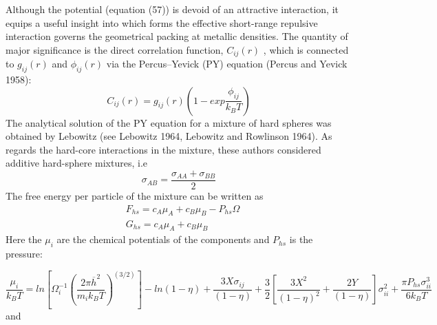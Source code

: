 \documentclass[12pt]{article}
\newcommand*{\1}{\hspace{1pt}}
\begin{document}
    Although the potential (equation (57)) is devoid of an attractive interaction, it equips a 
    useful insight into which forms the effective short-range repulsive interaction governs the 
    geometrical packing at metallic densities. The quantity of major significance is the direct
    correlation function, $C_{ij}(r)$ , which is connected to $g_{ij}(r)$ and $\phi_{ij}(r)$ via the Percus–Yevick
    (PY) equation (Percus and Yevick 1958):
        \begin{equation}
            C_{ij}(r) = g_{ij}(r)\left(1 - exp\frac{\phi_{ij}}{k_{B}T}\right)          \tag*{(i , j = A , B)}
        \end{equation}
    The analytical solution of the PY equation for a mixture of hard spheres was obtained by 
    Lebowitz (see Lebowitz 1964, Lebowitz and Rowlinson 1964). As regards the hard-core 
    interactions in the mixture, these authors considered additive hard-sphere mixtures, i.e
        \begin{equation}
            \sigma_{AB} = \frac{\sigma_{AA} + \sigma_{BB} }{2}
        \end{equation}
    The free energy per particle of the mixture can be written as
    \begin{align}
        &  F_{hs} = c_{A}\mu_{A} + c_{B}\mu_{B} - P _{hs}\Omega \\
        &  G_{hs} = c_{A}\mu_{A} + c_{B}\mu_{B}
        \end{align}
    Here the $\mu_i$ are the chemical potentials of the components and $P _{hs}$ is the pressure:

        \begin{equation}
            \frac{\mu_i}{k_{B}T} = ln \left[\Omega ^{-1}_{i}\left(\frac{2\pi \overline{h}^2}
            {m_{i}k_{B}T}\right)^(3/2)\right] - ln (1 - \eta) + \frac{3X\sigma_{ij}}{(1 - 
            \eta)} + \frac{3}{2}\left[\frac{3X^2}{(1 - \eta )^2} + \frac{2Y}{(1 - \eta)}\right] 
            \sigma^2_{ii} + \frac{\pi P _{hs}\sigma^3_{ii}}{6k_{B}T}
        \end{equation}
    and
\end{document}
